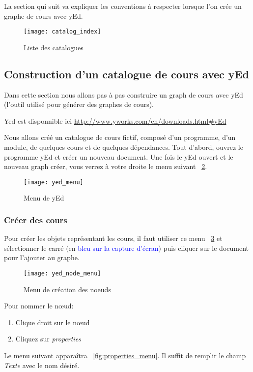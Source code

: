 La section qui suit va expliquer les conventions à respecter lorsque l'on crée un graphe de cours avec yEd.

\begin{figure}
\centering
\caption{Liste des catalogues}
\label{fig:catalog_index}
\texttt{[image: catalog\_index]}
\end{figure}

\subsection{Construction d'un catalogue de cours avec yEd}
Dans cette section nous allons pas à pas construire un graph de cours avec yEd (l'outil utilisé pour générer des graphes de cours).

Yed est disponnible ici \url{http://www.yworks.com/en/downloads.html\#yEd}

Nous allons créé un  catalogue de cours fictif, composé d'un programme, d'un module, de quelques cours et de quelques dépendances. Tout d'abord, ouvrez le programme yEd et créer un nouveau document. Une fois le yEd ouvert et le nouveau graph créer, vous verrez à votre droite le menu suivant ~\ref{fig:yed_menu}.

\begin{figure}[!htb]
\centering
\caption{Menu de yEd}
\label{fig:yed_menu}
\texttt{[image: yed\_menu]}
\end{figure}


\subsubsection{Créer des cours}
Pour créer les objets représentant les cours, il faut utiliser ce menu ~\ref{fig:yed_node_menu} et sélectionner le carré (en \textcolor{blue}{bleu sur la capture d'écran}) puis cliquer sur le document pour l'ajouter au graphe.

\begin{figure}
\centering
\caption{Menu de création des noeuds}
\label{fig:yed_node_menu}
\texttt{[image: yed\_node\_menu]}
\end{figure}

Pour nommer le nœud:
\begin{enumerate}
\item Clique droit sur le nœud
\item Cliquez sur \textit{properties}
\end{enumerate}

Le menu suivant apparaîtra ~\ref{fig:properties_menu}. Il suffit de remplir le champ \textit{Texte} avec le nom désiré.

